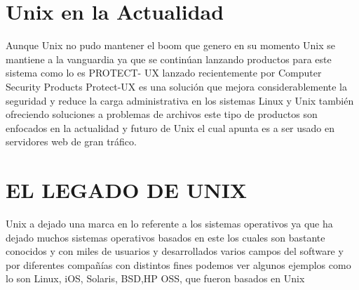 \section*{Unix en la Actualidad}
Aunque Unix no pudo mantener el boom que genero en su momento Unix se mantiene a la vanguardia ya que se continúan lanzando productos para este sistema  como lo es PROTECT-
UX lanzado recientemente por  Computer Security Products Protect-UX es una solución que mejora considerablemente la seguridad y reduce la carga administrativa en los 
sistemas Linux y Unix también ofreciendo soluciones a problemas de archivos este tipo de productos son enfocados en la actualidad y futuro de Unix el cual apunta es a ser  
usado en servidores web de gran tráfico.

\section*{EL LEGADO DE UNIX}
Unix  a dejado una marca en lo referente a los sistemas operativos ya que ha dejado  muchos sistemas operativos basados en este los cuales son bastante conocidos y con 
miles de usuarios y desarrollados varios campos del software y por diferentes compañías con distintos fines  podemos ver algunos ejemplos como lo son Linux, iOS, Solaris, 
BSD,HP OSS, que fueron basados en Unix


 